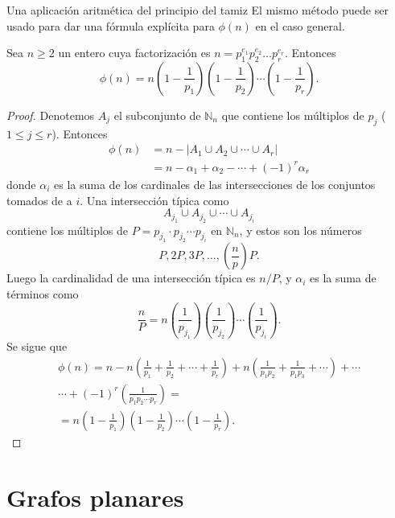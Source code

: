 \begin{section}{Una aplicación aritmética del principio del tamiz}
El mismo método puede ser usado para dar una fórmula explícita para $\phi(n)$ en el caso general.

\begin{teorema}\label{tA2.2} Sea $n \ge 2$ un entero cuya factorización es $n=p_1^{e_1}p_2^{e_2}\ldots p_r^{e_r}$. Entonces $$
\phi(n)=n\left(1-\frac{1}{p_1}\right)\left(1-\frac{1}{p_2}\right)\cdots\left(1-\frac{1}{p_r}\right).
$$
\end{teorema}
\begin{proof} Denotemos $A_j$ el subconjunto de $\mathbb N_n$ que contiene los múltiplos de $p_j$ ($1\le j \le r$). Entonces 
$$
\begin{aligned}
\phi(n) &= n- |A_1 \cup A_2 \cup \cdots \cup A_r| \\
       &= n -\alpha_1+ \alpha_2- \cdots +(-1)^r\alpha_r
\end{aligned}
$$
donde $\alpha_i$ es la suma de los cardinales de las intersecciones de los conjuntos tomados de a $i$. Una intersección típica como
$$
A_{j_1}\cup A_{j_2}\cup \cdots \cup A_{j_i}
$$
contiene los múltiplos de $P= p_{j_1}\cdot p_{j_2}\cdots p_{j_i}$ en $\mathbb N_n$, y estos son los números
$$
P,2P,3P,\ldots,\left(\frac{n}{p}\right)P.
$$
Luego la cardinalidad de una intersección típica es $n/P$, y $\alpha_i$ es la suma de términos como
$$
\frac{n}{P}= n\left(\frac{1}{p_{j_1}}\right)\left(\frac{1}{p_{j_2}}\right)\cdots \left(\frac{1}{p_{j_i}}\right).
$$
Se sigue que
\begin{multline*}
    \phi(n) = n - n\left(\frac{1}{p_1} + \frac{1}{p_2} + \cdots +\frac{1}{p_r}\right) +n\left(\frac{1}{p_1p_2} + \frac{1}{p_1p_3}+\cdots\right) + \cdots \\
    \cdots + (-1)^r \left(\frac{1}{p_1p_2 \cdots p_r}\right) =\\
    =n\left(1-\frac{1}{p_1}\right)\left(1-\frac{1}{p_2}\right)\cdots\left(1-\frac{1}{p_r}\right).
\end{multline*}


\end{proof}

\end{section}


\chapter[Grafos planares]{Grafos planares}\label{ape.grafos_planares}

